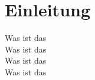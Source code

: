 
\section{Einleitung}
\begin{frame}
    Was ist das \\
    Was ist das \\
    Was ist das \\
    Was ist das \\
\end{frame}